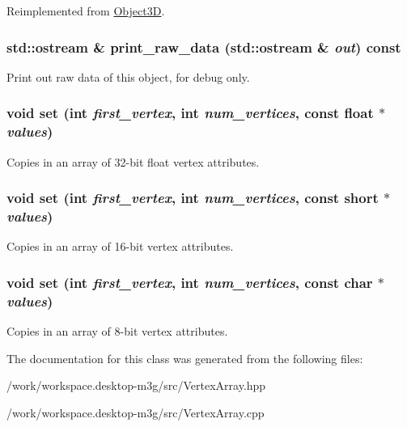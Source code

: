 Reimplemented from \hyperlink{classm3g_1_1Object3D_6fea17fa1532df3794f8cb39cb4f911f}{Object3D}.\hypertarget{classm3g_1_1VertexArray_85d61f1cdd10b3b5126cdb20291ae276}{
\subsubsection[{print\_\-raw\_\-data}]{\setlength{\rightskip}{0pt plus 5cm}std::ostream \& print\_\-raw\_\-data (std::ostream \& {\em out}) const}}
\label{classm3g_1_1VertexArray_85d61f1cdd10b3b5126cdb20291ae276}


Print out raw data of this object, for debug only. \hypertarget{classm3g_1_1VertexArray_24b9d666468f856b2bf09e450b20fdfb}{
\subsubsection[{set}]{\setlength{\rightskip}{0pt plus 5cm}void set (int {\em first\_\-vertex}, \/  int {\em num\_\-vertices}, \/  const float $\ast$ {\em values})}}
\label{classm3g_1_1VertexArray_24b9d666468f856b2bf09e450b20fdfb}


Copies in an array of 32-bit float vertex attributes. \hypertarget{classm3g_1_1VertexArray_f417744f1798d293c85c5e7fb6e1e846}{
\subsubsection[{set}]{\setlength{\rightskip}{0pt plus 5cm}void set (int {\em first\_\-vertex}, \/  int {\em num\_\-vertices}, \/  const short $\ast$ {\em values})}}
\label{classm3g_1_1VertexArray_f417744f1798d293c85c5e7fb6e1e846}


Copies in an array of 16-bit vertex attributes. \hypertarget{classm3g_1_1VertexArray_c92a86c7439c8e38c7e5b69e3eca3ee1}{
\subsubsection[{set}]{\setlength{\rightskip}{0pt plus 5cm}void set (int {\em first\_\-vertex}, \/  int {\em num\_\-vertices}, \/  const char $\ast$ {\em values})}}
\label{classm3g_1_1VertexArray_c92a86c7439c8e38c7e5b69e3eca3ee1}


Copies in an array of 8-bit vertex attributes. 

The documentation for this class was generated from the following files:\begin{CompactItemize}
\item 
/work/workspace.desktop-m3g/src/VertexArray.hpp\item 
/work/workspace.desktop-m3g/src/VertexArray.cpp\end{CompactItemize}
